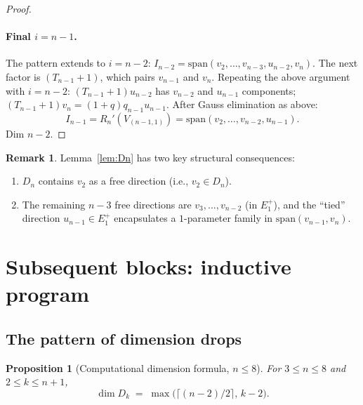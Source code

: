 \documentclass[11pt]{article}
\newtheorem{proposition}[theorem]{Proposition}
\theoremstyle{definition}
\newtheorem{remark}[theorem]{Remark}
\begin{document}
\begin{proof}
\paragraph{Final $i=n-1$.} The pattern extends to $i=n-2$:
$I_{n-2}=\mathrm{span}(v_2,\ldots,v_{n-3},u_{n-2},v_n)$. The next factor
is $(T_{n-1}{+}1)$, which pairs $v_{n-1}$ and $v_n$. Repeating the
above argument with $i=n-2$:
$(T_{n-1}{+}1)u_{n-2}$ has $v_{n-2}$ and $u_{n-1}$ components;
$(T_{n-1}{+}1)v_n=(1+q)q_{n-1}u_{n-1}$. After Gauss elimination as
above:
\[
   I_{n-1}=R_n'(V_{(n-1,1)})=\mathrm{span}(v_2,\ldots,v_{n-2},u_{n-1}).
\]
Dim $n-2$.
\end{proof}

\begin{remark}\label{rem:Dn-structure}
Lemma~\ref{lem:Dn} has two key structural consequences:
\begin{enumerate}[topsep=0.3em,itemsep=0.2em,leftmargin=2em]
\item $D_n$ contains $v_2$ as a free direction (i.e., $v_2\in D_n$).
\item The remaining $n-3$ free directions are $v_3,\ldots,v_{n-2}$
  (in $E_1^+$), and the ``tied'' direction $u_{n-1}\in E_1^+$
  encapsulates a $1$-parameter family in $\mathrm{span}(v_{n-1},v_n)$.
\end{enumerate}
\end{remark}

\section{Subsequent blocks: inductive program}\label{sec:Dk}

\subsection{The pattern of dimension drops}

\begin{proposition}[Computational dimension formula, $n\le 8$]\label{prop:dim}
For $3\le n\le 8$ and $2\le k\le n+1$,
\begin{equation}\label{eq:dim-formula}
   \dim D_k \;=\; \max\bigl(\lceil(n-2)/2\rceil,\,k-2\bigr).
\end{equation}
\end{proposition}
\end{document}
